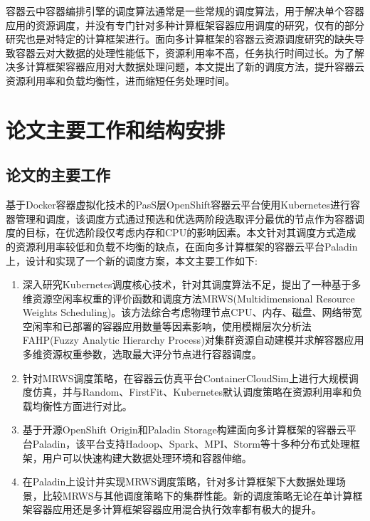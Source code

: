 容器云中容器编排引擎的调度算法通常是一些常规的调度算法，用于解决单个容器应用的资源调度，并没有专门针对多种计算框架容器应用调度的研究，仅有的部分研究也是对特定的计算框架进行。面向多计算框架的容器云资源调度研究的缺失导致容器云对大数据的处理性能低下，资源利用率不高，任务执行时间过长。为了解决多计算框架容器应用对大数据处理问题，本文提出了新的调度方法，提升容器云资源利用率和负载均衡性，进而缩短任务处理时间。

\section{论文主要工作和结构安排}
\subsection{论文的主要工作}
基于Docker容器虚拟化技术的PasS层OpenShift容器云平台使用Kubernetes进行容器管理和调度，该调度方式通过预选和优选两阶段选取评分最优的节点作为容器调度的目标，在优选阶段仅考虑内存和CPU的影响因素。本文针对其调度方式造成的资源利用率较低和负载不均衡的缺点，在面向多计算框架的容器云平台Paladin上，设计和实现了一个新的调度方案，本文主要工作如下:
 \begin{enumerate}[(1)]
\item 深入研究Kubernetes调度核心技术，针对其调度算法不足，提出了一种基于多维资源空闲率权重的评价函数和调度方法MRWS(Multidimensional Resource Weights Scheduling)。该方法综合考虑物理节点CPU、内存、磁盘、网络带宽空闲率和已部署的容器应用数量等因素影响，使用模糊层次分析法FAHP(Fuzzy Analytic Hierarchy Process)对集群资源自动建模并求解容器应用多维资源权重参数，选取最大评分节点进行容器调度。
\item 针对MRWS调度策略，在容器云仿真平台ContainerCloudSim上进行大规模调度仿真，并与Random、FirstFit、Kubernetes默认调度策略在资源利用率和负载均衡性方面进行对比。
\item 基于开源OpenShift Origin和Paladin Storage构建面向多计算框架的容器云平台Paladin，该平台支持Hadoop、Spark、MPI、Storm等十多种分布式处理框架，用户可以快速构建大数据处理环境和容器伸缩。
\item 在Paladin上设计并实现MRWS调度策略，针对多计算框架下大数据处理场景，比较MRWS与其他调度策略下的集群性能。新的调度策略无论在单计算框架容器应用还是多计算框架容器应用混合执行效率都有极大的提升。
\end{enumerate}

